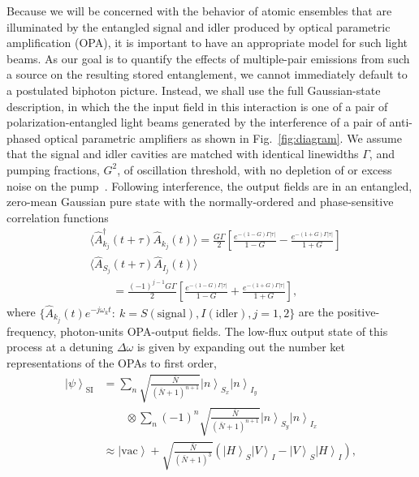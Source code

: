 \documentclass[aps,twocolumn,secnumarabic,amsmath,amssymb,pra,groupedaddress,
showpacs, showkeys,draft]{revtex4-1}
\newcommand{\ket}[1]{\left|#1\right\rangle}
\newcommand{\pna}[1]{\left(#1\right)}
\newcommand{\pnb}[1]{\left[#1\right]}
\newcommand{\abs}[1]{\left|#1\right|}
\begin{document}
Because we will be concerned with the behavior of atomic ensembles that are
illuminated by the entangled signal and idler produced by optical parametric
amplification (OPA), it is important to have an appropriate model for such
light beams. As our goal is to quantify the effects of multiple-pair emissions
from such a source on the resulting stored entanglement, we cannot immediately
default to a postulated biphoton picture. Instead, we shall use the full
Gaussian-state description, in which the the input field in this interaction is
one of a pair of polarization-entangled light beams generated by the
interference of a pair of anti-phased optical parametric amplifiers as shown in
Fig.~\ref{fig:diagram}. We assume that the signal and idler cavities are
matched with identical linewidths $\Gamma$, and pumping fractions, $G^2$, of
oscillation threshold, with no depletion of or excess noise on the
pump~\cite{1367-2630-4-1-347, 1464-4266-2-1-101}. Following interference, the
output fields are in an entangled, zero-mean Gaussian pure state with the
normally-ordered and phase-sensitive correlation functions
\begin{align}
&\langle \hat{A}^{\dagger}_{k_j}\pna{t+\tau} \hat{A}_{k_j}\pna{t}\rangle = \frac{G \Gamma}{2} 
\pnb{\frac{e^{-\pna{1-G}\Gamma \abs{\tau}}}{1-G}-\frac{e^{-\pna{1+G}\Gamma \abs{\tau}}}{1+G}}\nonumber \\
&\langle \hat{A}_{S_j}\pna{t+\tau} \hat{A}_{I_j}\pna{t}\rangle \nonumber \\ 
& \qquad =\frac{\pna{-1}^{j-1}G \Gamma}{2} 
\pnb{\frac{e^{-\pna{1-G}\Gamma \abs{\tau}}}{1-G}+\frac{e^{-\pna{1+G}\Gamma \abs{\tau}}}{1+G}},	
\end{align}
where $\{\hat{A}_{k_j}\pna{t}e^{-j\omega_k
  t}:~k=S\pna{\textrm{signal}},I\pna{\textrm{idler}},j=1,2\}$ are the positive-frequency, photon-units OPA-output fields. The low-flux output state
of this process at a detuning $\Delta \omega$ is given by expanding out the
number ket representations of the OPAs to first order,
\begin{align}
\ket{\psi}_{\textrm{SI}} & = \sum_n
\sqrt{\frac{\bar{N}}{\pna{\bar{N}+1}^{n+1}}} \ket{n}_{S_x}\ket{n}_{I_y}
\nonumber \\ & \qquad \otimes \sum_n \pna{-1}^n \sqrt{\frac{\bar{N}}{\pna{\bar{N}+1}^{n+1}}} \ket{n}_{S_y}\ket{n}_{I_x} \nonumber \\
& \approx \ket{\textrm{vac}}+\sqrt{\frac{\bar{N}}{\pna{\bar{N}+1}^{3}}}\pna{\ket{H}_S\ket{V}_I-\ket{V}_S\ket{H}_I},\label{eq:final_singlet}
\end{align}
\end{document}
